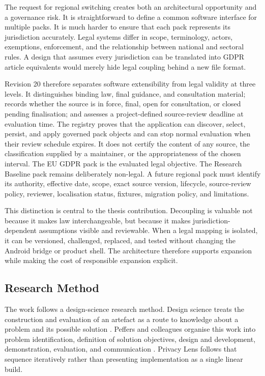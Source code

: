 The request for regional switching creates both an architectural opportunity and a governance risk. It is straightforward to define a common software interface for multiple packs. It is much harder to ensure that each pack represents its jurisdiction accurately. Legal systems differ in scope, terminology, actors, exemptions, enforcement, and the relationship between national and sectoral rules. A design that assumes every jurisdiction can be translated into GDPR article equivalents would merely hide legal coupling behind a new file format.

Revision 20 therefore separates software extensibility from legal validity at three levels. It distinguishes binding law, final guidance, and consultation material; records whether the source is in force, final, open for consultation, or closed pending finalisation; and assesses a project-defined source-review deadline at evaluation time. The registry proves that the application can discover, select, persist, and apply governed pack objects and can stop normal evaluation when their review schedule expires. It does not certify the content of any source, the classification supplied by a maintainer, or the appropriateness of the chosen interval. The EU GDPR pack is the evaluated legal objective. The Research Baseline pack remains deliberately non-legal. A future regional pack must identify its authority, effective date, scope, exact source version, lifecycle, source-review policy, reviewer, localisation status, fixtures, migration policy, and limitations.

This distinction is central to the thesis contribution. Decoupling is valuable not because it makes law interchangeable, but because it makes jurisdiction-dependent assumptions visible and reviewable. When a legal mapping is isolated, it can be versioned, challenged, replaced, and tested without changing the Android bridge or product shell. The architecture therefore supports expansion while making the cost of responsible expansion explicit.

\subsection{Research Method}

The work follows a design-science research method. Design science treats the construction and evaluation of an artefact as a route to knowledge about a problem and its possible solution \cite{hevner2004}. Peffers and colleagues organise this work into problem identification, definition of solution objectives, design and development, demonstration, evaluation, and communication \cite{peffers2007}. Privacy Lens follows that sequence iteratively rather than presenting implementation as a single linear build.

